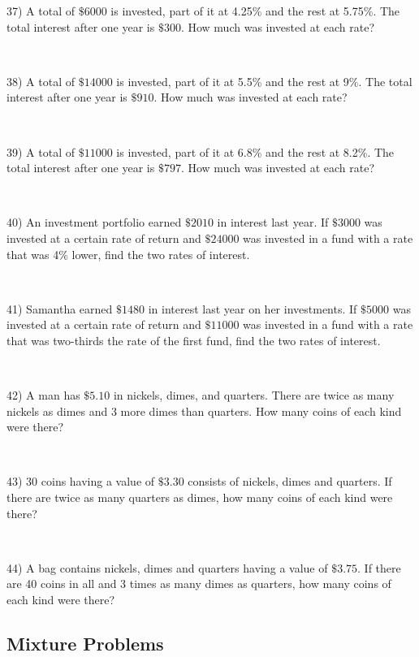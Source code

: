 {37) A total of $\$6000$ is invested, part of it at 4.25\% and the
rest at 5.75\%. The total interest after one year is
$\$300$. How much was invested at each rate?\par
~\par

38) A total of $\$14000$ is invested, part of it at 5.5\% and the
rest at 9\%. The total interest after one year is $\$910$.
How much was invested at each rate?\par
~\par

39) A total of $\$11000$ is invested, part of it at 6.8\% and the
rest at 8.2\%. The total interest after one year is
$\$797$. How much was invested at each rate?\par
~\par

40) An investment portfolio earned $\$2010$ in interest last year. If
$\$3000$ was invested at a certain rate of
return and $\$24000$ was invested in a fund with a rate
that was 4\% lower, find the two rates of interest.\par
~\par

41) Samantha earned $\$1480$ in interest last year on her
investments. If $\$5000$ was invested at a certain rate of
return and $\$11000$ was invested in a fund with a rate
that was two-thirds the rate of the first fund, find the two rates of interest.\par
~\par

42) A man has $\$5.10$ in nickels, dimes, and quarters. There are
twice as many nickels as dimes and 3 more dimes than
quarters. How many coins of each kind were there?\par
~\par

43) 30 coins having a value of $\$3.30$ consists of nickels, dimes
and quarters. If there are twice as many quarters as
dimes, how many coins of each kind were there?\par
~\par

44) A bag contains nickels, dimes and quarters having a value of
$\$3.75$. If there are 40 coins in all and 3 times as
many dimes as quarters, how many coins of each kind were there?\par}

\newpage

\subsection{Mixture Problems}\par

